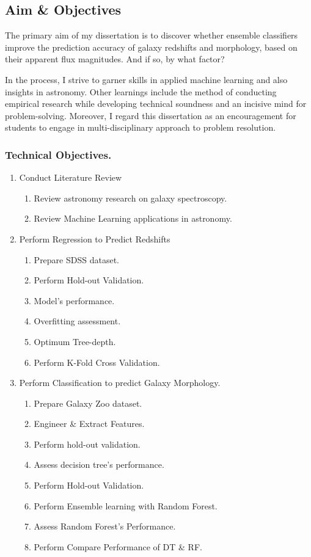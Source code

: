\subsection{Aim \& Objectives}
The primary aim of my dissertation is to discover whether ensemble classifiers improve the prediction accuracy of galaxy redshifts and morphology, based on their apparent flux magnitudes. And if so, by what factor?

In the process, I strive to garner skills in applied machine learning and also insights in astronomy. Other learnings include the method of conducting empirical research while developing technical soundness and an incisive mind for problem-solving. Moreover, I regard this dissertation as an encouragement for students to engage in multi-disciplinary approach to problem resolution.

\subsubsection{Technical Objectives.}
\begin{enumerate}
\item Conduct Literature Review
	\begin{enumerate}
		\item Review  astronomy research on galaxy spectroscopy.
		\item Review Machine Learning applications in astronomy.
	\end{enumerate}
\item Perform Regression to Predict Redshifts
\begin{enumerate}
	\item Prepare SDSS dataset.
	\item Perform Hold-out Validation.
	\item Model's performance.
	\item Overfitting assessment.
	\item Optimum Tree-depth.
	\item Perform K-Fold Cross Validation.
\end{enumerate}
\item Perform Classification to predict Galaxy Morphology.
\begin{enumerate}
	\item Prepare Galaxy Zoo dataset.
	\item Engineer \& Extract Features.
	\item Perform hold-out validation.
	\item Assess decision tree's performance.
	\item Perform Hold-out Validation.
	\item Perform Ensemble learning with Random Forest.
	\item Assess Random Forest's Performance.
	\item Perform Compare Performance of DT \& RF.
\end{enumerate}
\end{enumerate}

